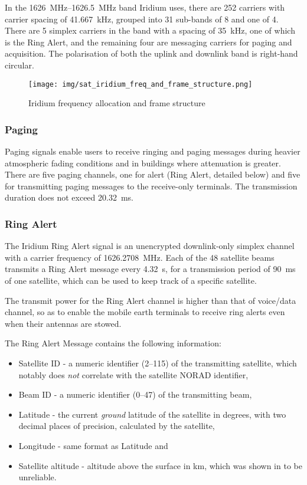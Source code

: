 In the \qtyrange{1626}{1626.5}{\MHz} band Iridium uses, there are 252 carriers with carrier spacing of \qty{41.667}{\kHz}, grouped into 31 sub-bands of 8 and one of 4. There are 5 simplex carriers in the band with a spacing of \qty{35}{\kHz}, one of which is the Ring Alert, and the remaining four are messaging carriers for paging and acquisition. The polarisation of both the uplink and downlink band is right-hand circular\cite{sat04}.

\begin{figure}
    \centering
    \texttt{[image: img/sat\_iridium\_freq\_and\_frame\_structure.png]}
    \caption{Iridium frequency allocation and frame structure\cite{sop12}}
    \label{sat_iridium_freq_and_frame_structure}
\end{figure}

\subsubsection{Paging}
Paging signals enable users to receive ringing and paging messages during heavier atmospheric fading conditions and in buildings where attenuation is greater. There are five paging channels, one for alert (Ring Alert, detailed below) and five for transmitting paging messages to the receive-only terminals.  The transmission duration does not exceed \qty{20.32}{\ms}\cite{sat09}.

\subsubsection{Ring Alert}
The Iridium Ring Alert signal is an unencrypted downlink-only simplex channel with a carrier frequency of \qty{1626.2708}{\MHz}\cite{sat04}. Each of the 48 satellite beams transmits a Ring Alert message every \qty{4.32}{\s}, for a transmission period of \qty{90}{\ms} of one satellite\cite{sat07}, which can be used to keep track of a specific satellite\cite{sop11}.

The transmit power for the Ring Alert channel is higher than that of voice/data channel, so as to enable the mobile earth terminals to receive ring alerts even when their antennas are stowed\cite{sat09}.

The Ring Alert Message contains the following information\cite{sat08}:
\begin{itemize}
    \item Satellite ID - a numeric identifier (\numrange{2}{115}) of the transmitting satellite, which notably does \emph{not} correlate with the satellite NORAD identifier,
    \item Beam ID - a numeric identifier (\numrange{0}{47}) of the transmitting beam,
    \item Latitude - the current \emph{ground} latitude of the satellite in degrees, with two decimal places of precision, calculated by the satellite,
    \item Longitude - same format as Latitude and
    \item Satellite altitude - altitude above the surface in \unit{\km}, which was shown in \cite{sat08} to be unreliable.
\end{itemize}

